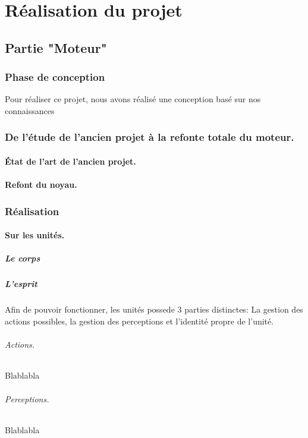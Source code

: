 \documentclass{report}
\begin{document}
\newpage
\part{Réalisation du projet}
\newpage

\chapter{Partie "Moteur"}
\section{Phase de conception}
Pour réaliser ce projet, nous avons réalisé une conception basé sur nos connaissances
\section{De l'étude de l'ancien projet à la refonte totale du moteur.}
\subsection{État de l'art de l'ancien projet.}


\subsection{Refont du noyau.}

\section{Réalisation}
\subsection{Sur les unités.}
\subsubsection{Le corps}
\subsubsection{L'esprit}
Afin de pouvoir fonctionner, les unités possede 3 parties distinctes: La gestion des actions possibles, la gestion des perceptions et l'identité propre de l'unité.
\paragraph{Actions.}
Blablabla
\paragraph{Perceptions.}
Blablabla
\end{document}

